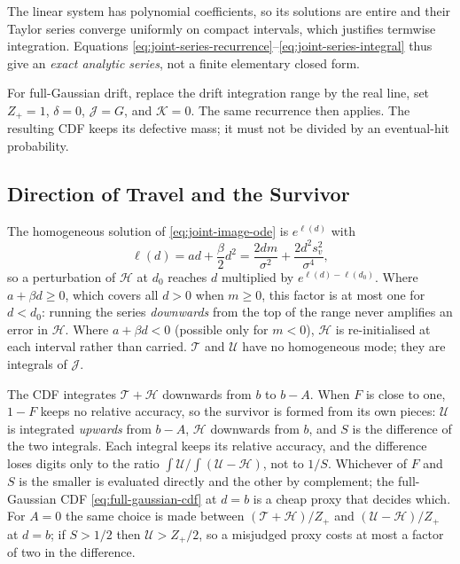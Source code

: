 \documentclass[12pt]{article}
\begin{document}
The linear system has polynomial coefficients, so its solutions are entire and their Taylor series converge uniformly on compact intervals, which justifies termwise integration. Equations
\eqref{eq:joint-series-recurrence}--\eqref{eq:joint-series-integral} thus give
an \emph{exact analytic series}, not a finite elementary closed form.

For full-Gaussian drift, replace the drift integration range by the real line, set $Z_+=1$, $\delta=0$, $\mathcal J=G$, and $\mathcal K=0$. The same recurrence then applies. The resulting CDF keeps its defective mass; it must not be divided by an eventual-hit probability.

\subsection{Direction of Travel and the Survivor}
The homogeneous solution of \eqref{eq:joint-image-ode} is $e^{\ell(d)}$ with
\begin{equation}
 \ell(d)=ad+\frac{\beta}{2}d^2=\frac{2dm}{\sigma^2}+\frac{2d^2s_v^2}{\sigma^4},
\end{equation}
so a perturbation of $\mathcal H$ at $d_0$ reaches $d$ multiplied by $e^{\ell(d)-\ell(d_0)}$. Where $a+\beta d\ge0$, which covers all $d>0$ when $m\ge0$, this factor is at most one for $d<d_0$: running the series \emph{downwards} from the top of the range never amplifies an error in $\mathcal H$. Where $a+\beta d<0$ (possible only for $m<0$), $\mathcal H$ is re-initialised at each interval rather than carried. $\mathcal T$ and $\mathcal U$ have no homogeneous mode; they are integrals of $\mathcal J$.

The CDF integrates $\mathcal T+\mathcal H$ downwards from $b$ to $b-A$. When $F$ is close to one, $1-F$ keeps no relative accuracy, so the survivor is formed from its own pieces: $\mathcal U$ is integrated \emph{upwards} from $b-A$, $\mathcal H$ downwards from $b$, and $S$ is the difference of the two integrals. Each integral keeps its relative accuracy, and the difference loses digits only to the ratio $\int\mathcal U/\int(\mathcal U-\mathcal H)$, not to $1/S$. Whichever of $F$ and $S$ is the smaller is evaluated directly and the other by complement; the full-Gaussian CDF \eqref{eq:full-gaussian-cdf} at $d=b$ is a cheap proxy that decides which. For $A=0$ the same choice is made between $(\mathcal T+\mathcal H)/Z_+$ and $(\mathcal U-\mathcal H)/Z_+$ at $d=b$; if $S>1/2$ then $\mathcal U>Z_+/2$, so a misjudged proxy costs at most a factor of two in the difference.
\end{document}

